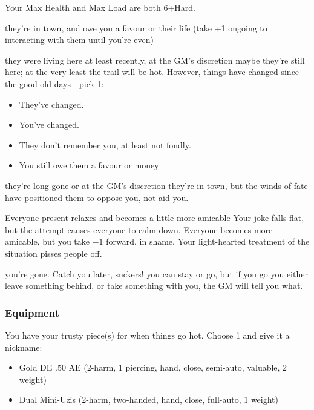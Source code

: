 Your Max Health and Max Load are both 6+Hard.

{they're in town, and owe you a favour or their life (take +1 ongoing to interacting with them until you're even)}
{they were living here at least recently, at the GM's discretion maybe they're still here; at the very least the trail will be hot. However, things have changed since the good old days---pick 1:
\begin{itemize}
\item They've changed.
\item You've changed.
\item They don't remember you, at least not fondly.
\item You still owe them a favour or money
\end{itemize}}
{they're long gone or at the GM's discretion they're in town, but the winds of fate have positioned them to oppose you, not aid you.}

{Everyone present relaxes and becomes a little more amicable}
{Your joke falls flat, but the attempt causes everyone to calm down. Everyone becomes more amicable, but you take $-1$ forward, in shame.}
{Your light-hearted treatment of the situation pisses people off.}

{you're gone. Catch you later, suckers!}
{you can stay or go, but if you go you either leave something behind, or take something with you, the GM will tell you what.}

\subsubsection{Equipment}
You have your trusty piece(s) for when things go hot. Choose 1 and give it a nickname:
\begin{itemize}
\item Gold DE .50 AE (2-harm, 1 piercing, hand, close, semi-auto, valuable, 2 weight)
\item Dual Mini-Uzis (2-harm, two-handed, hand, close, full-auto, 1 weight) 
\end{itemize}


